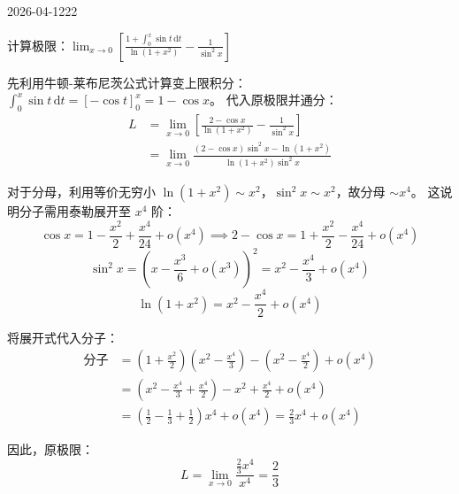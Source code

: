 \begin{mistake}{2026-04-12}{22}

\begin{problemcontent}
计算极限：\(\displaystyle \lim_{x \to 0} \left[ \frac{1+\int_0^x \sin t \,\mathrm{d}t}{\ln(1+x^2)} - \frac{1}{\sin^2 x} \right]\)
\end{problemcontent}

\begin{solutioncontent}
先利用牛顿-莱布尼茨公式计算变上限积分：
\(\int_0^x \sin t \,\mathrm{d}t = [-\cos t]_0^x = 1 - \cos x\)。
代入原极限并通分：
\[
\begin{aligned}
L &= \lim_{x \to 0} \left[ \frac{2 - \cos x}{\ln(1+x^2)} - \frac{1}{\sin^2 x} \right] \\
&= \lim_{x \to 0} \frac{(2-\cos x)\sin^2 x - \ln(1+x^2)}{\ln(1+x^2) \sin^2 x}
\end{aligned}
\]

对于分母，利用等价无穷小 \(\ln(1+x^2) \sim x^2\)，\(\sin^2 x \sim x^2\)，故分母 \(\sim x^4\)。
这说明分子需用泰勒展开至 \(x^4\) 阶：
\[
\cos x = 1 - \frac{x^2}{2} + \frac{x^4}{24} + o(x^4) \implies 2-\cos x = 1 + \frac{x^2}{2} - \frac{x^4}{24} + o(x^4)
\]
\[
\sin^2 x = \left(x - \frac{x^3}{6} + o(x^3)\right)^2 = x^2 - \frac{x^4}{3} + o(x^4)
\]
\[
\ln(1+x^2) = x^2 - \frac{x^4}{2} + o(x^4)
\]

将展开式代入分子：
\[
\begin{aligned}
分子 &= \left( 1 + \frac{x^2}{2} \right)\left( x^2 - \frac{x^4}{3} \right) - \left( x^2 - \frac{x^4}{2} \right) + o(x^4) \\
&= \left( x^2 - \frac{x^4}{3} + \frac{x^4}{2} \right) - x^2 + \frac{x^4}{2} + o(x^4) \\
&= \left(\frac{1}{2} - \frac{1}{3} + \frac{1}{2}\right)x^4 + o(x^4) = \frac{2}{3}x^4 + o(x^4)
\end{aligned}
\]

因此，原极限：
\[
L = \lim_{x \to 0} \frac{\frac{2}{3}x^4}{x^4} = \frac{2}{3}
\]
\end{solutioncontent}


\end{mistake}
